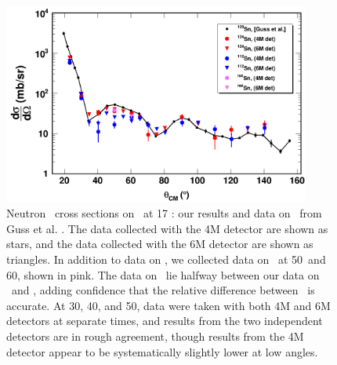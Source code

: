 \begin{figure}[tb]
    \centering
    \includegraphics[width = 0.9\textwidth]{figures/ECSResults2018.png}
    \caption[Neutron \el\ on \snTwelveFour\ at 17 \mega\electronvolt: our results and
    literature data]
    {
        Neutron \el\ cross sections on \snTwelveFour\ at 17
        \mega\electronvolt: our results and data on \snTwenty\ from Guss et al.
        \cite{Guss1989}. The data collected with the 4M detector
        are shown as stars, and the data collected
        with the 6M detector are shown as triangles. In addition to data on
        \snTwelveFour, we collected data on \snNat\ at 50\textdegree\ and
        60\textdegree, shown in pink. The data on \snNat\ lie halfway between our data on
        \snTwelve\ and \snFour, adding confidence that the relative difference
        between \snTwelveFour\ is accurate. At 30\textdegree,
        40\textdegree, and 50\textdegree, data were taken with both 4M
        and 6M detectors at separate times, and results from the two independent
        detectors are in rough agreement, though results from the 4M detector appear
        to be systematically slightly lower at low angles.
    }
    \label{SnECS_17MeV}
\end{figure}

\afterpage{\clearpage}
